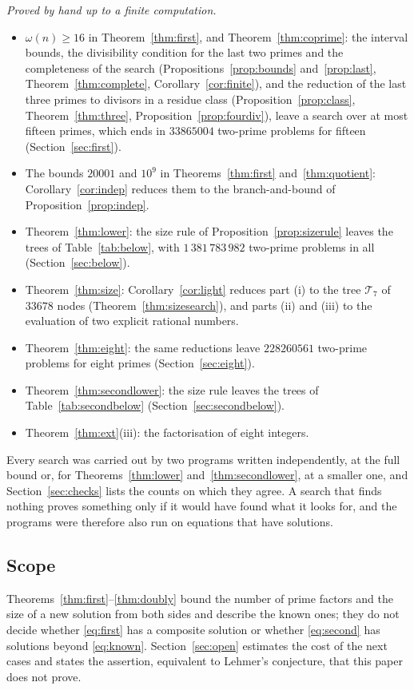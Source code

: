 \documentclass[11pt,reqno]{amsart}
\numberwithin{equation}{section}
\theoremstyle{plain}
\theoremstyle{definition}
\theoremstyle{remark}
\begin{document}
\emph{Proved by hand up to a finite computation.}
\begin{itemize}[leftmargin=*]
\item $\omega(n)\ge16$ in Theorem~\ref{thm:first}, and
Theorem~\ref{thm:coprime}: the interval bounds, the divisibility
condition for the last two primes and the completeness of the search
(Propositions~\ref{prop:bounds} and~\ref{prop:last},
Theorem~\ref{thm:complete}, Corollary~\ref{cor:finite}), and the
reduction of the last three primes to divisors in a residue class
(Proposition~\ref{prop:class}, Theorem~\ref{thm:three},
Proposition~\ref{prop:fourdiv}), leave a search over at most fifteen
primes, which ends in $33865004$ two-prime problems for fifteen
(Section~\ref{sec:first}).
\item The bounds $20001$ and $10^9$ in Theorems~\ref{thm:first}
and~\ref{thm:quotient}: Corollary~\ref{cor:indep} reduces them to the
branch-and-bound of Proposition~\ref{prop:indep}.
\item Theorem~\ref{thm:lower}: the size rule of
Proposition~\ref{prop:sizerule} leaves the trees of
Table~\ref{tab:below}, with $1\,381\,783\,982$ two-prime problems in all
(Section~\ref{sec:below}).
\item Theorem~\ref{thm:size}: Corollary~\ref{cor:light} reduces part
(i) to the tree $\mathcal T_7$ of $33678$ nodes
(Theorem~\ref{thm:sizesearch}), and parts (ii) and (iii) to the
evaluation of two explicit rational numbers.
\item Theorem~\ref{thm:eight}: the same reductions leave $228260561$
two-prime problems for eight primes (Section~\ref{sec:eight}).
\item Theorem~\ref{thm:secondlower}: the size rule leaves the trees of
Table~\ref{tab:secondbelow} (Section~\ref{sec:secondbelow}).
\item Theorem~\ref{thm:ext}(iii): the factorisation of eight integers.
\end{itemize}
Every search was carried out by two programs written independently,
at the full bound or, for Theorems~\ref{thm:lower}
and~\ref{thm:secondlower}, at a smaller one, and
Section~\ref{sec:checks} lists the counts on which they agree. A search
that finds nothing proves something only if it would have found what it
looks for, and the programs were therefore also run on equations that
have solutions.

\subsection{Scope}
Theorems~\ref{thm:first}--\ref{thm:doubly} bound the number of prime
factors and the size of a new solution from both sides and describe the known ones; they do not
decide whether \eqref{eq:first} has a composite solution or whether
\eqref{eq:second} has solutions beyond \eqref{eq:known}.
Section~\ref{sec:open} estimates the cost of the next cases and states
the assertion, equivalent to Lehmer's conjecture, that this paper does
not prove.
\end{document}
